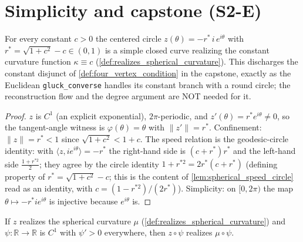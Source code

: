 \section{Simplicity and capstone (S2-E)}
\label{sec:sphere_simplicity}

\begin{lemma}
  \leanok
  \label{lem:spherical_circle_realizes}
  For every constant $c>0$ the centered circle $z(\theta)=-r^\ast\,i\,e^{i\theta}$ with
  $r^\ast=\sqrt{1+c^2}-c\in(0,1)$ is a simple closed curve realizing the constant
  curvature function $\kappa\equiv c$
  (\cref{def:realizes_spherical_curvature}). This discharges the constant disjunct of
  \cref{def:four_vertex_condition} in the capstone, exactly as the Euclidean
  \texttt{gluck\_converse} handles its constant branch with a round circle; the
  reconstruction flow and the degree argument are NOT needed for it.
\end{lemma}

\begin{proof}
  \leanok
  $z$ is $C^1$ (an explicit exponential), $2\pi$-periodic, and
  $z'(\theta)=r^\ast e^{i\theta}\ne0$, so the tangent-angle witness is
  $\varphi(\theta)=\theta$ with $\|z'\|=r^\ast$. Confinement: $\|z\|=r^\ast<1$ since
  $\sqrt{1+c^2}<1+c$. The speed relation is the geodesic-circle identity: with
  $\langle z,ie^{i\theta}\rangle=-r^\ast$ the right-hand side is
  $(c+r^\ast)r^\ast$ and the left-hand side $\tfrac{1+r^{\ast2}}{2}$; they agree by the
  circle identity $1+r^{\ast2}=2r^\ast(c+r^\ast)$ (defining property of
  $r^\ast=\sqrt{1+c^2}-c$; this is the content of \cref{lem:spherical_speed_circle} read
  as an identity, with $c=(1-r^{\ast2})/(2r^\ast)$). Simplicity: on $[0,2\pi)$ the map
  $\theta\mapsto -r^\ast ie^{i\theta}$ is injective because $e^{i\theta}$ is.
\end{proof}

\begin{lemma}
  \label{lem:realizes_spherical_comp}
  If $z$ realizes the spherical curvature $\mu$
  (\cref{def:realizes_spherical_curvature}) and $\psi:\mathbb R\to\mathbb R$ is $C^1$
  with $\psi'>0$ everywhere, then $z\circ\psi$ realizes $\mu\circ\psi$.
\end{lemma}

